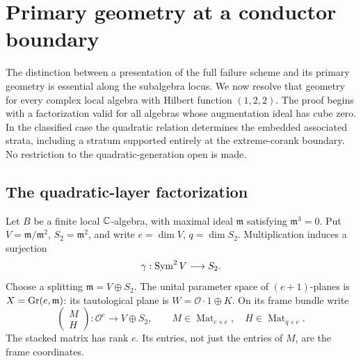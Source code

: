 \section{Primary geometry at a conductor boundary}
\label{sec:loewy-boundary}
The distinction between a presentation of the full failure scheme and
its primary geometry is essential along the subalgebra locus. We now
resolve that geometry for every complex local algebra with Hilbert
function $(1,2,2)$. The proof begins with a factorization valid for all
algebras whose augmentation ideal has cube zero. In the classified
case the quadratic relation determines the embedded associated strata,
including a stratum supported entirely at the extreme-corank boundary.
No restriction to the quadratic-generation open is made.

\subsection{The quadratic-layer factorization}
Let $B$ be a finite local $\mathbb C$-algebra, with maximal ideal
$\mathfrak m$ satisfying $\mathfrak m^3=0$. Put
$V=\mathfrak m/\mathfrak m^2$, $S_2=\mathfrak m^2$, and write
$e=\dim V$, $q=\dim S_2$. Multiplication induces a surjection
\[
 \gamma:\operatorname{Sym}^2V\longrightarrow S_2.
\]
Choose a splitting $\mathfrak m=V\oplus S_2$. The unital parameter
space of $(e+1)$-planes is $X=\operatorname{Gr}(e,\mathfrak m)$: its tautological
plane is $W=\mathcal O\cdot1\oplus K$. On its frame bundle write
\begin{equation}\label{eq:loewy-frame}
 \begin{pmatrix}M\\H\end{pmatrix}:\mathcal O^e\longrightarrow
             V\oplus S_2,
 \qquad M\in\operatorname{Mat}_{e\times e},\quad
 H\in\operatorname{Mat}_{q\times e}.
\end{equation}
The stacked matrix has rank $e$. Its entries, not just the entries
of $M$, are the frame coordinates.

